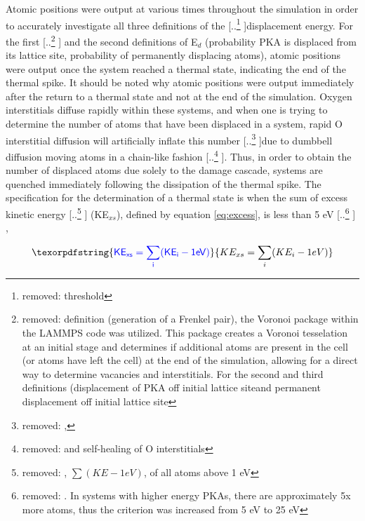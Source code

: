 \documentclass[review]{elsarticle} %
\providecommand{\DIFaddtex}[1]{{\protect\color{blue} \sf #1}} %
\providecommand{\DIFdeltex}[1]{{\protect\color{red} [..\footnote{removed: #1} ]}} %
\providecommand{\DIFaddbegin}{} %
\providecommand{\DIFaddend}{} %
\providecommand{\DIFdelbegin}{} %
\providecommand{\DIFdelend}{} %
\providecommand{\DIFadd}[1]{\texorpdfstring{\DIFaddtex{#1}}{#1}} %
\providecommand{\DIFdel}[1]{\texorpdfstring{\DIFdeltex{#1}}{}} %
\newcommand{\DIFscaledelfig}{0.5}
\newlength{\DIFdelgraphicswidth} %
\newlength{\DIFdelgraphicsheight} %
\newcommand{\DIFaddincludegraphics}[2][]{{\color{blue}\fbox{\DIFOincludegraphics[#1]{#2}}}} %
\newcommand{\DIFdelincludegraphics}[2][]{%
\sbox{\DIFdelgraphicsbox}{\DIFOincludegraphics[#1]{#2}}%
\settoboxwidth{\DIFdelgraphicswidth}{\DIFdelgraphicsbox} %
\settoboxtotalheight{\DIFdelgraphicsheight}{\DIFdelgraphicsbox} %
\scalebox{\DIFscaledelfig}{%
\parbox[b]{\DIFdelgraphicswidth}{\usebox{\DIFdelgraphicsbox}\\[-\baselineskip] \rule{\DIFdelgraphicswidth}{0em}}\llap{\resizebox{\DIFdelgraphicswidth}{\DIFdelgraphicsheight}{%
\setlength{\unitlength}{\DIFdelgraphicswidth}%
\begin{picture}(1,1)%
\thicklines\linethickness{2pt} %
{\color[rgb]{1,0,0}\put(0,0){\framebox(1,1){}}}%
{\color[rgb]{1,0,0}\put(0,0){\line( 1,1){1}}}%
{\color[rgb]{1,0,0}\put(0,1){\line(1,-1){1}}}%
\end{picture}%
}\hspace*{3pt}}} %
} %
\DeclareRobustCommand{\DIFaddbegin}{\DIFOaddbegin \let\includegraphics\DIFaddincludegraphics} %
\DeclareRobustCommand{\DIFaddend}{\DIFOaddend \let\includegraphics\DIFOincludegraphics} %
\DeclareRobustCommand{\DIFdelbegin}{\DIFOdelbegin \let\includegraphics\DIFdelincludegraphics} %
\DeclareRobustCommand{\DIFdelend}{\DIFOaddend \let\includegraphics\DIFOincludegraphics} %
\begin{document}
\FloatBarrier

\DIFaddend Atomic positions were output at various times throughout the simulation in order to accurately investigate all three definitions of the \DIFdelbegin \DIFdel{threshold }\DIFdelend displacement energy. For the first \DIFdelbegin \DIFdel{definition (generation of a Frenkel pair), the Voronoi package within the LAMMPS code \cite{lammps,voro} was utilized. This package creates a Voronoi tesselation at an initial stage and determines if additional atoms are present in the cell (or atoms have left the cell) at the end of the simulation, allowing for a direct way to determine vacancies and interstitials. For the second and third definitions (displacement of PKA off initial lattice siteand permanent displacement off initial lattice site}\DIFdelend \DIFaddbegin \DIFadd{and the second definitions of E$_d$ (probability PKA is displaced from its lattice site, probability of permanently displacing atoms}\DIFaddend ), atomic positions were output once the system reached a thermal state, indicating the end of the thermal spike. It should be noted why atomic positions were output immediately after the return to a thermal state and not at the end of the simulation. Oxygen interstitials diffuse rapidly within these systems, and when one is trying to determine the number of atoms that have been displaced in a system, rapid O interstitial diffusion will artificially inflate this number \DIFdelbegin \DIFdel{, }\DIFdelend due to dumbbell diffusion moving atoms in a chain-like fashion \DIFdelbegin \DIFdel{and self-healing of O interstitials }\DIFdelend \cite{ajay}. Thus, in order to obtain the number of displaced atoms due solely to the damage cascade, systems are quenched immediately following the dissipation of the thermal spike. The specification for the determination of a thermal state is when the sum of excess kinetic energy \DIFdelbegin \DIFdel{, $\sum (KE-1 eV)$, of all atoms above 1 eV }\DIFdelend \DIFaddbegin \DIFadd{(KE$_{xs}$), defined by equation \ref{eq:excess}, }\DIFaddend is less than 5 eV\DIFdelbegin \DIFdel{. In systems with higher energy PKAs, there are approximately 5x more atoms, thus the criterion was increased from 5 eV to 25 eV}\DIFdelend \DIFaddbegin \DIFadd{,
}

\begin{equation}
\DIFadd{\label{eq:excess}
KE_{xs} = \sum_i (KE_i - 1 eV)
}\end{equation}
\end{document}
